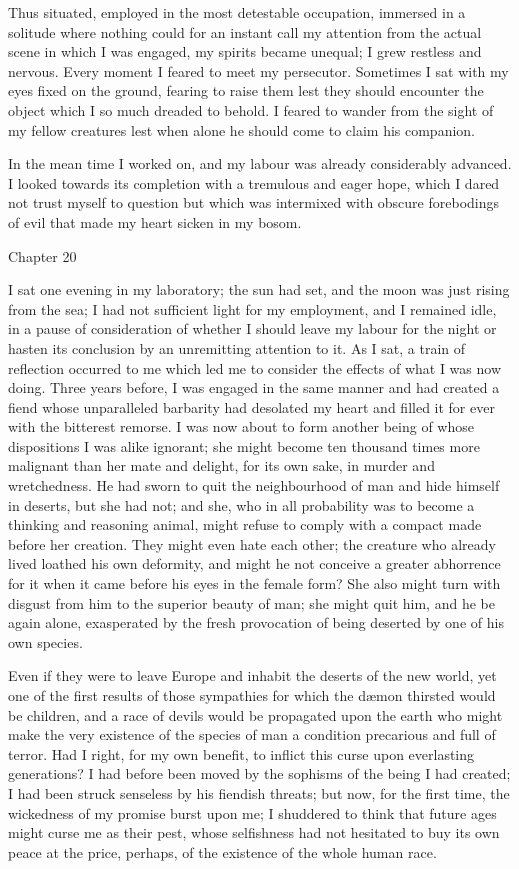 \documentclass[12pt,openright]{book}
\begin{document}
Thus situated, employed in the most detestable occupation, immersed in a solitude where nothing could for an instant call my attention from the actual scene in which I was engaged, my spirits became unequal; I grew restless and nervous. Every moment I feared to meet my persecutor. Sometimes I sat with my eyes fixed on the ground, fearing to raise them lest they should encounter the object which I so much dreaded to behold. I feared to wander from the sight of my fellow creatures lest when alone he should come to claim his companion.

In the mean time I worked on, and my labour was already considerably advanced. I looked towards its completion with a tremulous and eager hope, which I dared not trust myself to question but which was intermixed with obscure forebodings of evil that made my heart sicken in my bosom.

Chapter 20

I sat one evening in my laboratory; the sun had set, and the moon was just rising from the sea; I had not sufficient light for my employment, and I remained idle, in a pause of consideration of whether I should leave my labour for the night or hasten its conclusion by an unremitting attention to it. As I sat, a train of reflection occurred to me which led me to consider the effects of what I was now doing. Three years before, I was engaged in the same manner and had created a fiend whose unparalleled barbarity had desolated my heart and filled it for ever with the bitterest remorse. I was now about to form another being of whose dispositions I was alike ignorant; she might become ten thousand times more malignant than her mate and delight, for its own sake, in murder and wretchedness. He had sworn to quit the neighbourhood of man and hide himself in deserts, but she had not; and she, who in all probability was to become a thinking and reasoning animal, might refuse to comply with a compact made before her creation. They might even hate each other; the creature who already lived loathed his own deformity, and might he not conceive a greater abhorrence for it when it came before his eyes in the female form? She also might turn with disgust from him to the superior beauty of man; she might quit him, and he be again alone, exasperated by the fresh provocation of being deserted by one of his own species.

Even if they were to leave Europe and inhabit the deserts of the new world, yet one of the first results of those sympathies for which the dæmon thirsted would be children, and a race of devils would be propagated upon the earth who might make the very existence of the species of man a condition precarious and full of terror. Had I right, for my own benefit, to inflict this curse upon everlasting generations? I had before been moved by the sophisms of the being I had created; I had been struck senseless by his fiendish threats; but now, for the first time, the wickedness of my promise burst upon me; I shuddered to think that future ages might curse me as their pest, whose selfishness had not hesitated to buy its own peace at the price, perhaps, of the existence of the whole human race.
\end{document}
